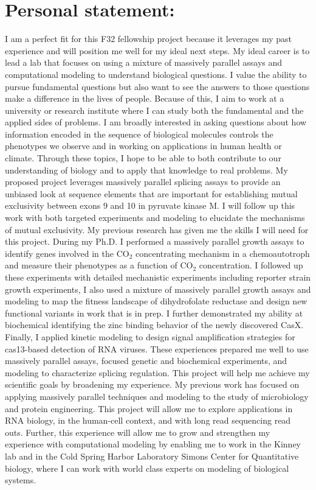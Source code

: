 \documentclass{article}
\begin{document}
\section*{Personal statement:}
I am a perfect fit for this F32 fellowship project because it leverages my past experience and will position me well for my ideal next steps.
My ideal career is to lead a lab that focuses on using a mixture of massively parallel assays and computational modeling to understand  biological questions.
I value the ability to pursue fundamental questions but also want to see the answers to those questions make a difference in the lives of people. 
Because of this, I aim to work at a university or research institute where I can study both the fundamental and the applied sides of problems. 
I am broadly interested in asking questions about how information encoded in the sequence of biological molecules controls the phenotypes we observe and in working on applications in human health or climate. 
Through these topics, I hope to be able to both contribute to our understanding of biology and to apply that knowledge to real problems.
My proposed project leverages massively parallel splicing assays to provide an unbiased look at sequence elements that are important for establishing mutual exclusivity between exons 9 and 10 in pyruvate kinase M.
I will follow up this work with both targeted experiments and modeling to elucidate the mechanisms of mutual exclusivity.
My previous research has given me the skills I will need for this project.
During my Ph.D. I performed a massively parallel growth assays to identify genes involved in the CO$_2$ concentrating mechanism in a chemoautotroph and measure their phenotypes as a function of CO$_2$ concentration.
I followed up these experiments with detailed mechanistic experiments including reporter strain growth experiments, \supercite{Desmarais2019-yc,Flamholz2022-yo}
I also used a mixture of massively parallel growth assays and modeling to map the fitness landscape of dihydrofolate reductase and design new functional variants in work that is in prep.
I further demonstrated my ability at biochemical identifying the zinc binding behavior of the newly discovered CasX.\supercite{Liu2019-nk} 
Finally, I applied kinetic modeling to design signal amplification strategies for cas13-based detection of RNA viruses.\supercite{Liu2021-pu}
These experiences prepared me well to use massively parallel assays, focused genetic and biochemical experiments, and modeling to characterize splicing regulation. 
This project will help me achieve my scientific goals by broadening my experience.
My previous work has focused on applying massively parallel techniques and modeling to the study of microbiology and protein engineering.
This project will allow me to explore applications in RNA biology, in the human-cell context, and with long read sequencing read outs.
Further, this experience will allow me to grow and strengthen my experience with computational modeling by enabling me to work in the Kinney lab and in the Cold Spring Harbor Laboratory Simons Center for Quantitative biology, where I can work with world class experts on modeling of biological systems.
\end{document}

